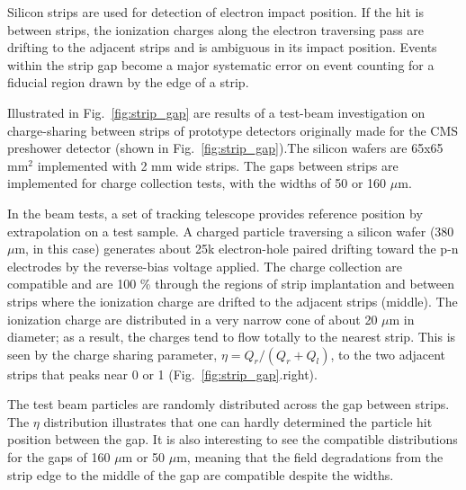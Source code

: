 Silicon strips are used for detection of electron impact position. If the hit is between strips, the ionization charges along the electron traversing pass are drifting to the adjacent strips and is ambiguous in its impact position. Events within the strip gap become a major systematic error on event counting for a fiducial region drawn by the edge of a strip.

Illustrated in Fig.~\ref{fig:strip_gap} are results of a test-beam investigation on charge-sharing between strips of prototype detectors originally made for the CMS preshower detector (shown in Fig.~\ref{fig:strip_gap}).The silicon wafers are 65x65 mm$^2$ implemented with 2 mm wide strips. The gaps between strips are implemented for charge collection tests, with the widths of 50 or 160 $\mu$m.

In the beam tests, a set of tracking telescope provides reference position by extrapolation on a test sample. A charged particle traversing a silicon wafer (380 $\mu$m, in this case) generates about 25k electron-hole paired drifting toward the p-n electrodes by the reverse-bias voltage applied. The charge collection are compatible and are 100 \% through the regions of strip implantation and between strips where the ionization charge are drifted to the adjacent strips (middle). The ionization charge are distributed in a very narrow cone of about 20 $\mu$m in diameter; as a result, the charges tend to flow totally to the nearest strip. This is seen by the charge sharing parameter, $\eta = Q_r/(Q_r+Q_l)$, to the two adjacent strips that peaks near 0 or 1 (Fig.~\ref{fig:strip_gap}.right).

The test beam particles are randomly distributed across the gap between strips. The $\eta$ distribution illustrates that one can hardly determined the particle hit position between the gap. It is also interesting to see the compatible distributions for the gaps of 160 $\mu$m or 50 $\mu$m, meaning that the field degradations from the strip edge to the middle of the gap are compatible despite the widths.


